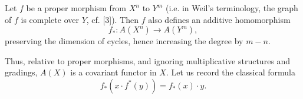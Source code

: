 Let $f$ be a proper morphism from $X^n$ to $Y^m$ (i.e. in Weil's terminology, the graph of $f$ is complete over $Y$, cf. [3]). Then $f$ also defines an additive homomorphism
\begin{equation}\tag{2.2}
f_*:A(X^n)\longrightarrow A(Y^m),
\end{equation}
preserving the dimension of cycles, hence increasing the degree by $m-n$.




Thus, relative to proper morphisms, and ignoring multiplicative structures and gradings, $A(X)$ is a covariant functor in $X$. Let us record the classical formula
\begin{equation}\tag{2.3}
 f_*(x\cdot f^*(y))=f_*(x)\cdot y .
\end{equation}

